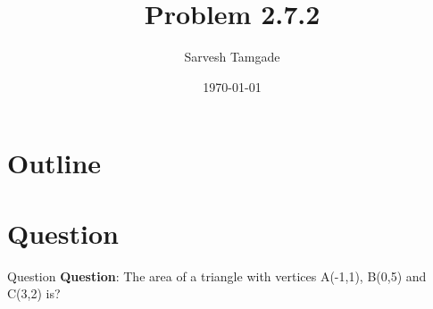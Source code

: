 \documentclass{beamer}
\title{Problem 2.7.2}
\author{Sarvesh Tamgade}
\date{\today}
\theoremstyle{remark}
\numberwithin{equation}{section}
\begin{document}
\begin{frame}
\titlepage
\end{frame}

\section*{Outline}
\begin{frame}
\tableofcontents
\end{frame}
\section{Question}
\begin{frame}{Question}
\textbf{Question}:
\centering
The area of a triangle with vertices A(-1,1), B(0,5) and C(3,2) is?
\end{frame}
\end{document}
